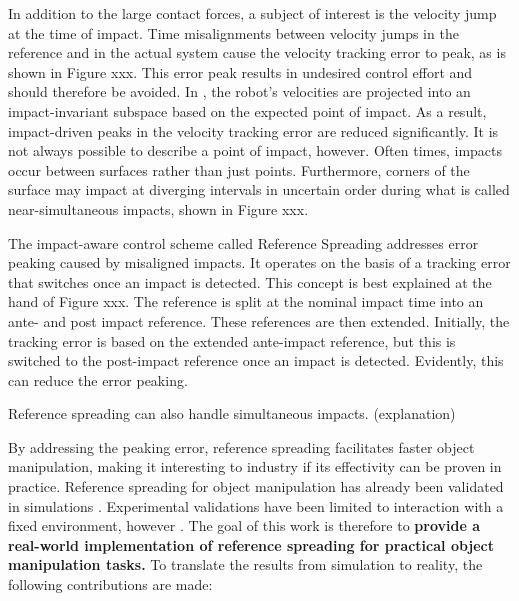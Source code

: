 \documentclass[a4paper, 10pt, conference]{ieeeconf}
\begin{document}
    In addition to the large contact forces, a subject of interest is the velocity jump at the time of impact. Time misalignments between velocity jumps in the reference and in the actual system cause the velocity tracking error to peak\cite{biemondTrackingControlMechanical2012}, as is shown in Figure xxx. This error peak results in undesired control effort and should therefore be avoided. In \cite{yangImpactInvariantControl2021}, the robot's velocities are projected into an impact-invariant subspace based on the expected point of impact. As a result, impact-driven peaks in the velocity tracking error are reduced significantly. It is not always possible to describe a point of impact, however. Often times, impacts occur between surfaces rather than just points. Furthermore, corners of the surface may impact at diverging intervals in uncertain order during what is called near-simultaneous impacts, shown in Figure xxx.

    The impact-aware control scheme called Reference Spreading \cite{sacconSensitivityAnalysisHybrid2014} addresses error peaking caused by misaligned impacts. It operates on the basis of a tracking error that switches once an impact is detected. This concept is best explained at the hand of Figure xxx. The reference is split at the nominal impact time into an ante- and post impact reference. These references are then extended. Initially, the tracking error is based on the extended ante-impact reference, but this is switched to the post-impact reference once an impact is detected. Evidently, this can reduce the error peaking.

    Reference spreading can also handle simultaneous impacts. \cite{vansteenRobotControlSimultaneous2021} (explanation)

    By addressing the peaking error, reference spreading facilitates faster object manipulation, making it interesting to industry if its effectivity can be proven in practice. Reference spreading for object manipulation has already been validated in simulations \cite{vansteenRobotControlSimultaneous2021,zwartImpactAwareLearningDemonstration2019}. Experimental validations have been limited to interaction with a fixed environment, however \cite{rijnenReferenceSpreadingTracking2020,uitendaalTeachingRobotsInteraction2022}. The goal of this work is therefore to \textbf{provide a real-world implementation of reference spreading for practical object manipulation tasks.} To translate the results from simulation to reality, the following contributions are made:
\end{document}
